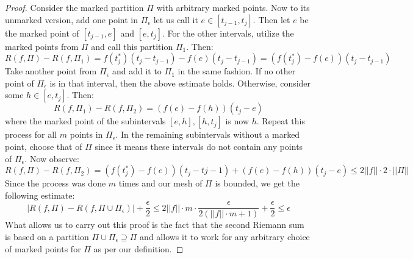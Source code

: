\documentclass[10pt,letterpaper]{article} %
\begin{document}
\begin{proof}
Consider the marked partition $\Pi$ with arbitrary marked points. Now to its unmarked version, add one point in $\Pi_\epsilon$ let us call it $e \in [t_{j-1}, t_j]$. Then let $e$ be the marked point of $[t_{j-1}, e]$ and $[e, t_{j}]$. For the other intervals, utilize the marked points from $\Pi$ and call this partition $\Pi_1$. Then:
\begin{equation*}
R(f, \Pi) - R(f, \Pi_1) = f(t_j^*)(t_j - t_{j-1}) - f(e)(t_j - t_{j-1}) = (f(t_j^*) - f(e))(t_j - t_{j-1})
\end{equation*}
Take another point from $\Pi_\epsilon$ and add it to $\Pi_1$ in the same fashion. If no other point of $\Pi_\epsilon$ is in that interval, then the above estimate holds. Otherwise, consider some $h \in [e, t_j]$. Then:
\begin{equation*}
R(f, \Pi_1) - R(f, \Pi_2) = (f(e) - f(h))(t_j - e)
\end{equation*}
where the marked point of the subintervals $[e, h], [h, t_j]$ is now $h$. Repeat this process for all $m$ points in $\Pi_\epsilon$. In the remaining subintervals without a marked point, choose that of $\Pi$ since it means these intervals do not contain any points of $\Pi_\epsilon$. Now observe:
\begin{equation*}
R(f, \Pi) - R(f, \Pi_2) = (f(t_j^*) - f(e))(t_j - t{j-1}) + (f(e) - f(h))(t_j - e) \leqslant 2||f|| \cdot 2 \cdot ||\Pi||
\end{equation*}
Since the process was done $m$ times and our mesh of $\Pi$ is bounded, we get the following estimate:
\begin{equation*}
|R(f, \Pi) - R(f, \Pi \cup \Pi_\epsilon)| + \frac{\epsilon}{2}\leqslant 2||f|| \cdot m \cdot \frac{\epsilon}{2(||f|| \cdot m + 1)} + \frac{\epsilon}{2} \leqslant \epsilon
\end{equation*}
What allows us to carry out this proof is the fact that the second Riemann sum is based on a partition $\Pi \cup \Pi_\epsilon \supseteq \Pi$ and allows it to work for any arbitrary choice of marked points for $\Pi$ as per our definition. 
\end{proof}
\end{document}
